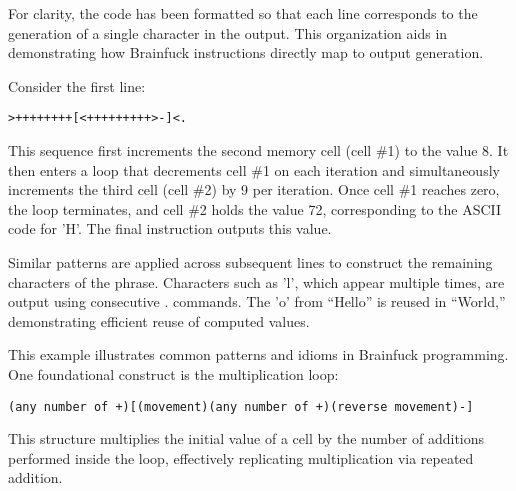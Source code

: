\par For clarity, the code has been formatted so that each line corresponds to the generation of a single character in the output. This organization aids in demonstrating how Brainfuck instructions directly map to output generation.

\par Consider the first line:

\begin{verbatim}
>++++++++[<+++++++++>-]<.
\end{verbatim}

\par This sequence first increments the second memory cell (cell \#1) to the value 8. It then enters a loop that decrements cell \#1 on each iteration and simultaneously increments the third cell (cell \#2) by 9 per iteration. Once cell \#1 reaches zero, the loop terminates, and cell \#2 holds the value 72, corresponding to the ASCII code for 'H'. The final instruction outputs this value.

\par Similar patterns are applied across subsequent lines to construct the remaining characters of the phrase. Characters such as 'l', which appear multiple times, are output using consecutive . commands. The 'o' from “Hello” is reused in “World,” demonstrating efficient reuse of computed values.

\par This example illustrates common patterns and idioms in Brainfuck programming. One foundational construct is the multiplication loop:

\begin{verbatim}
(any number of +)[(movement)(any number of +)(reverse movement)-]
\end{verbatim}

\par This structure multiplies the initial value of a cell by the number of additions performed inside the loop, effectively replicating multiplication via repeated addition.

